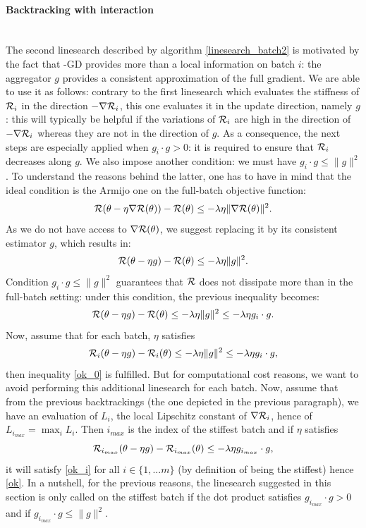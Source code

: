 \paragraph{Backtracking with interaction}
~~\\
The second linesearch described by algorithm \ref{linesearch_batch2} 
is motivated by the fact that \Speth-GD provides more than a local information on batch $i$: the aggregator $g$ provides a consistent 
approximation of the full gradient. We are able to use it as follows: 
contrary to the first linesearch which evaluates the stiffness of $\mathcal{R}_i$ in the direction $-\nabla \mathcal{R}_i$, this one evaluates it in the update direction, namely $g$: 
this will typically be helpful if the variations of $\mathcal{R}_i$ are high in the direction of $-\nabla \mathcal{R}_i$ whereas they are not in the direction of $g$. 
As a consequence, the next steps are especially applied when $g_i \cdot g>0$: it is required to ensure that $\mathcal{R}_i$ decreases along $g$. 
We also impose another condition: we must have $g_i \cdot g \leq \|g\|^2$.
To understand the reasons behind the latter, one has to have in mind that the ideal condition is the Armijo one on the full-batch objective function:
\begin{equation*}
	\mathcal{R}(\theta-\eta \nabla \mathcal{R}(\theta)) - \mathcal{R}(\theta) \leq -\lambda \eta \|\nabla \mathcal{R}(\theta)\|^2.
\end{equation*}
As we do not have access to $\nabla \mathcal{R}(\theta)$, we suggest replacing it by its consistent estimator $g$, which results in:
\begin{equation}
  \label{ok_0}
	\mathcal{R}(\theta-\eta g) - \mathcal{R}(\theta) \leq -\lambda \eta \|g\|^2.
\end{equation}   
Condition  $g_i \cdot g \leq \|g\|^2$ guarantees that $\mathcal{R}$ does not dissipate more than in the full-batch setting: under this condition, the previous inequality becomes:
\begin{equation}
  \label{ok}
	\mathcal{R}(\theta-\eta g) - \mathcal{R}(\theta) \leq -\lambda \eta \|g\|^2 \leq -\lambda \eta g_i\cdot g.
\end{equation}
{Now, assume that for each batch, $\eta$ satisfies 
\begin{equation}
  \label{ok_i}
	\mathcal{R}_i(\theta-\eta g) - \mathcal{R}_i(\theta) \leq -\lambda \eta \|g\|^2 \leq -\lambda \eta g_i\cdot g,
\end{equation}
then inequality \eqref{ok_0} is fulfilled.  
But for computational cost reasons, we want to avoid performing this additional linesearch for each batch. 
Now, assume that from the previous backtrackings (the one depicted in the previous paragraph), 
we have an evaluation of $L_i$, the local Lipschitz constant of $\nabla \mathcal{R}_i$, hence of $L_{i_{max}}=\max_i L_i$. Then $i_{max}$
is the index of the stiffest batch and if $\eta$ satisfies
\begin{equation*}
	\mathcal{R}_{i_{max}}(\theta-\eta g) - \mathcal{R}_{i_{max}}(\theta) \leq -\lambda \eta g_{i_{max}}\cdot g,
\end{equation*}
it will satisfy \eqref{ok_i} for all $i\in\{1,...m\}$ (by definition of being the stiffest) hence \eqref{ok}.} 
In a nutshell, for the previous reasons, the linesearch suggested in this section is only called on the stiffest batch if the dot product satisfies $g_{i_{max}} \cdot g>0$ and if
$g_{i_{max}} \cdot g \leq \|g\|^2$. 
\ \\

